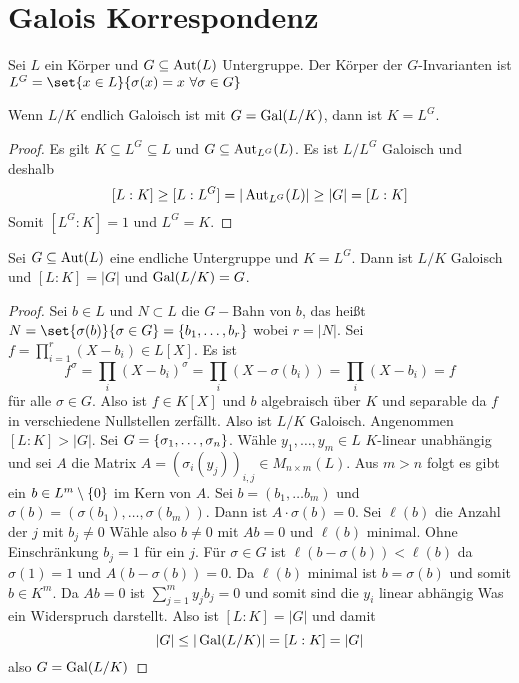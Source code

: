 \section{Galois Korrespondenz}
\begin{Def}
    Sei \(L\) ein Körper und \(G\subseteq \operatorname{Aut}(L)\) Untergruppe.
    Der Körper der \(G\)-Invarianten ist \(L^G=\set{x\in L}{\sigma(x)=x\ \forall \sigma\in G}\)
\end{Def}
\begin{Lemma}\label{Lem:Galois1}
    Wenn \(L/K\) endlich Galoisch ist mit \(G=\operatorname{Gal}(L/K)\), dann ist \(K=L^G\).
\end{Lemma}
\begin{proof}
    Es gilt \(K\subseteq L^G\subseteq L\) und \(G\subseteq\operatorname{Aut}_{L^G}(L)\). Es ist \(L/L^G\) Galoisch und deshalb
    \[[L:K]\geq [L:L^G]=|\operatorname{Aut}_{L^G}(L)|\geq |G|=[L:K]\]
    Somit \([L^G:K]=1\) und \(L^G=K\).
\end{proof}
\begin{Satz}\label{Satz:Galois2}
    Sei \(G\subseteq \operatorname{Aut}(L)\) eine endliche Untergruppe und \(K=L^G\). Dann ist \(L/K\) Galoisch und \([L:K]=|G|\) und \(\operatorname{Gal}(L/K)=G\).
\end{Satz}
\begin{proof}
    Sei \(b\in L\) und \(N\subset L\) die \(G-\)Bahn von \(b\), das heißt \(N=\set{\sigma(b)}{ \sigma\in G}=\{b_1,\dots,b_r\}\) wobei \(r=|N|\). Sei \(f=\prod_{i=1}^r(X-b_i)\in L[X]\).
    Es ist \[f^\sigma=\prod_i(X-b_i)^\sigma=\prod_i(X-\sigma(b_i))=\prod_i(X-b_i)=f\] für alle \(\sigma\in G.\) Also ist \(f\in K[X]\) und \(b\) algebraisch über \(K\) und separable da \(f\) in verschiedene Nullstellen zerfällt.
    Also ist \(L/K\) Galoisch.
    Angenommen \([L:K]>|G|\). Sei \(G=\{\sigma_1,\dots,\sigma_n\}\). Wähle \(y_1,\dots,y_m\in L\) \(K\)-linear unabhängig und sei \(A\) die Matrix \(A=(\sigma_i(y_j))_{i,j}\in M_{n\times m}(L)\).
    Aus \(m>n\) folgt es gibt ein \(b\in L^m\setminus\{0\}\) im Kern von \(A\).
    Sei \(b=(b_1,\dots b_m)\) und \(\sigma(b)=(\sigma(b_1),\dots,\sigma(b_m))\).
    Dann ist \(A\cdot \sigma(b)=0\).
    Sei \(\ell(b)\) die Anzahl der \(j\) mit \(b_j\neq 0\) Wähle also \(b\neq 0\) mit \(Ab=0\) und \(\ell(b)\) minimal. Ohne Einschränkung \(b_j=1\) für ein \(j\).
    Für \(\sigma\in G\) ist \(\ell(b-\sigma(b))<\ell(b)\) da \(\sigma(1)=1\) und \(A(b-\sigma(b))=0\). Da \(\ell(b)\) minimal ist \(b=\sigma(b)\) und somit \(b\in K^m\).
    Da \(Ab=0\) ist \(\sum_{j=1}^my_jb_j=0\) und somit sind die \(y_i\) linear abhängig Was ein Widerspruch darstellt.
    Also ist \([L:K]=|G|\) und damit 
    \[|G|\leq |\operatorname{Gal}(L/K)|=[L:K]=|G|\] also \(G=\operatorname{Gal}(L/K)\)
\end{proof}
